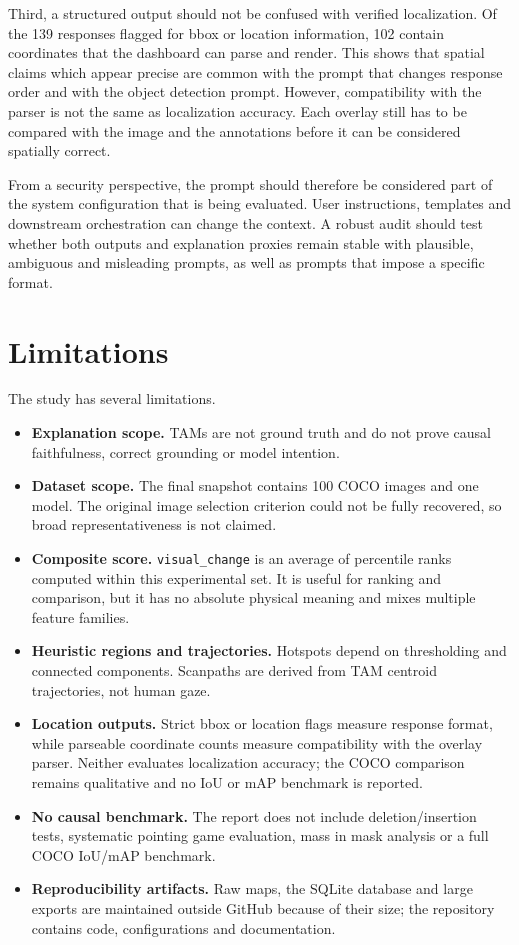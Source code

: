 \documentclass[11pt,a4paper]{article}
\newcommand{\code}[1]{\texttt{\small #1}}
\begin{document}
Third, a structured output should not be confused with verified localization. Of the 139 responses flagged for bbox or location information, 102 contain coordinates that the dashboard can parse and render. This shows that spatial claims which appear precise are common with the prompt that changes response order and with the object detection prompt. However, compatibility with the parser is not the same as localization accuracy. Each overlay still has to be compared with the image and the annotations before it can be considered spatially correct.

From a security perspective, the prompt should therefore be considered part of the system configuration that is being evaluated. User instructions, templates and downstream orchestration can change the context. A robust audit should test whether both outputs and explanation proxies remain stable with plausible, ambiguous and misleading prompts, as well as prompts that impose a specific format.

\section{Limitations}

The study has several limitations.

\begin{itemize}
  \item \textbf{Explanation scope.} TAMs are not ground truth and do not prove causal faithfulness, correct grounding or model intention.
  \item \textbf{Dataset scope.} The final snapshot contains 100 COCO images and one model. The original image selection criterion could not be fully recovered, so broad representativeness is not claimed.
  \item \textbf{Composite score.} \code{visual\_change} is an average of percentile ranks computed within this experimental set. It is useful for ranking and comparison, but it has no absolute physical meaning and mixes multiple feature families.
  \item \textbf{Heuristic regions and trajectories.} Hotspots depend on thresholding and connected components. Scanpaths are derived from TAM centroid trajectories, not human gaze.
  \item \textbf{Location outputs.} Strict bbox or location flags measure response format, while parseable coordinate counts measure compatibility with the overlay parser. Neither evaluates localization accuracy; the COCO comparison remains qualitative and no IoU or mAP benchmark is reported.
  \item \textbf{No causal benchmark.} The report does not include deletion/insertion tests, systematic pointing game evaluation, mass in mask analysis or a full COCO IoU/mAP benchmark.
  \item \textbf{Reproducibility artifacts.} Raw maps, the SQLite database and large exports are maintained outside GitHub because of their size; the repository contains code, configurations and documentation.
\end{itemize}
\end{document}
